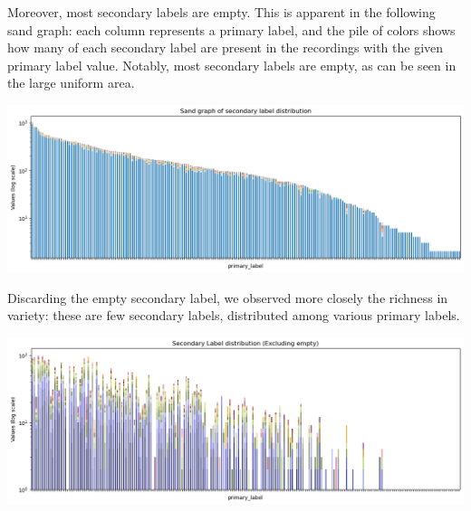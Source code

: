 \documentclass[10pt]{article}
\begin{document}
\vspace{1em}

\begin{minipage}{0.48\linewidth}
Moreover, most secondary labels are empty. This is apparent in the following sand graph: each column represents a primary label, and the pile of colors shows how many of each secondary label are present in the recordings with the given primary label value. Notably, most secondary labels are empty, as can be seen in the large uniform area.
\end{minipage}
\hfill
\begin{minipage}{0.48\linewidth}
  \includegraphics[width=\linewidth]{img/train_secondary_sand.png}
\end{minipage}

\vspace{1em}

\begin{minipage}{0.48\linewidth}
Discarding the empty secondary label, we observed more closely the richness in variety: these are few secondary labels, distributed among various primary labels.
\end{minipage}
\hfill
\begin{minipage}{0.48\linewidth}
  \includegraphics[width=\linewidth]{img/train_secondary_sand_nonempty.png}
\end{minipage}

\vspace{1em}
\end{document}
